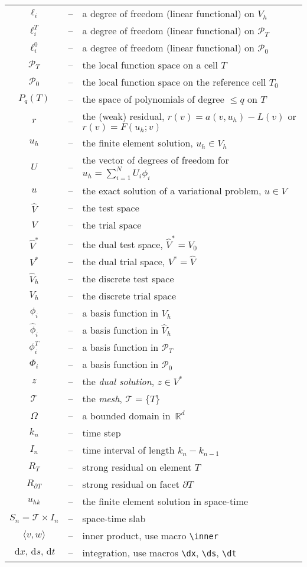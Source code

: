\documentclass{article}
\newcommand{\inner}[2]{\langle #1, #2 \rangle}
\newcommand{\dx}{\, \mathrm{d}x}
\newcommand{\ds}{\, \mathrm{d}s}
\newcommand{\dt}{\, \mathrm{d}t}
\begin{document}
\begin{longtable}{ccl}
    $\ell_i$ &--&
    a degree of freedom (linear functional) on $V_h$ \\
    $\ell^T_i$ &--&
    a degree of freedom (linear functional) on $\mathcal{P}_T$ \\
    $\ell^0_i$ &--&
    a degree of freedom (linear functional) on $\mathcal{P}_0$ \\
    $\mathcal{P}_T$ &--&
    the local function space on a cell $T$ \\
    $\mathcal{P}_0$ &--&
    the local function space on the reference cell $T_0$ \\
    $P_q(T)$ &--&
    the space of polynomials of degree $\leq q$ on $T$ \\
    $r$ &--&
    the (weak) residual, $r(v) = a(v, u_h) - L(v)$ or $r(v) = F(u_h; v)$ \\
    $u_h$ &--&
    the finite element solution, $u_h \in V_h$ \\
    $U$ &--&
    the vector of degrees of freedom for $u_h = \sum_{i=1}^N U_i \phi_i$ \\
    $u$ &--&
    the exact solution of a variational problem, $u \in V$ \\
    $\hat{V}$ &--&
    the test space \\
    $V$ &--&
    the trial space \\
    $\hat{V}^*$ &--&
    the dual test space, $\hat{V}^* = V_0$ \\
    $V^*$ &--&
    the dual trial space, $V^* = \hat{V}$ \\
    $\hat{V}_h$ &--&
    the discrete test space \\
    $V_h$ &--&
    the discrete trial space \\
    $\phi_i$ &--&
    a basis function in $V_h$ \\
    $\hat{\phi}_i$ &--&
    a basis function in $\hat{V}_h$ \\
    $\phi_i^T$ &--&
    a basis function in $\mathcal{P}_T$ \\
    $\Phi_i$ &--&
    a basis function in $\mathcal{P}_0$ \\
    $z$ &--&
    the \emph{dual solution}, $z \in V^*$ \\
    $\mathcal{T}$ &--&
    the \emph{mesh}, $\mathcal{T} = \{T\}$ \\
    $\Omega$ &--&
    a bounded domain in~$\mathbb{R}^d$ \\
    $k_n$ &--&
    time step \\
    $I_n$ &--&
    time interval of length $k_{n} - k_{n-1}$ \\
    $R_T$ &--&
    strong residual on element $T$ \\
    $R_{\partial T}$ &--&
    strong residual on facet $\partial T$ \\
    $u_{hk}$ &--&
    the finite element solution in space-time \\
    $S_n = \mathcal{T}\times I_n$ &--&
    space-time slab \\
    $\inner{v}{w}$ &--&
    inner product, use macro \verb|\inner| \\
    $\dx, \ds, \dt$ &--&
    integration, use macros \verb|\dx|, \verb|\ds|, \verb|\dt| \\
  \end{longtable}
\linespread{1.0}
\end{document}
